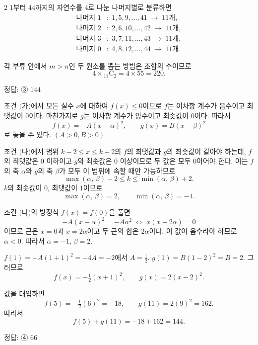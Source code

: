 \documentclass[10pt]{article}
\begin{document}
\begin{multicols}{2}
$1$부터 $44$까지의 자연수를 $4$로 나눈 나머지별로 분류하면
\begin{align*}
\text{나머지 } 1&:\; 1, 5, 9, \ldots, 41 \;\to\; 11\text{개}, \\
\text{나머지 } 2&:\; 2, 6, 10, \ldots, 42 \;\to\; 11\text{개}, \\
\text{나머지 } 3&:\; 3, 7, 11, \ldots, 43 \;\to\; 11\text{개}, \\
\text{나머지 } 0&:\; 4, 8, 12, \ldots, 44 \;\to\; 11\text{개}.
\end{align*}

각 부류 안에서 $m > n$인 두 원소를 뽑는 방법은 조합의 수이므로
\[ 4 \times {}_{11}\mathrm{C}_2 = 4 \times 55 = 220. \]

\begin{answerbox}정답: ③ $144$\end{answerbox}

조건 $(\!$가$)$에서 모든 실수 $x$에 대하여 $f(x) \le 0$이므로 $f$는 이차항 계수가 음수이고 최댓값이 $0$이다. 마찬가지로 $g$는 이차항 계수가 양수이고 최솟값이 $0$이다. 따라서
\[ f(x) = -A(x - \alpha)^2,\qquad g(x) = B(x - \beta)^2 \]
로 놓을 수 있다. $(A > 0, B > 0)$

조건 $(\!$나$)$에서 범위 $k - 2 \le x \le k + 2$의 $f$의 최댓값과 $g$의 최솟값이 같아야 하는데, $f$의 최댓값은 $0$ 이하이고 $g$의 최솟값은 $0$ 이상이므로 두 값은 모두 $0$이어야 한다. 이는 $f$의 축 $\alpha$와 $g$의 축 $\beta$가 모두 이 범위에 속할 때만 가능하므로
\[ \max(\alpha,\,\beta) - 2 \le k \le \min(\alpha,\,\beta) + 2. \]
$k$의 최솟값이 $0$, 최댓값이 $1$이므로
\[ \max(\alpha,\,\beta) = 2,\qquad \min(\alpha,\,\beta) = -1. \]

조건 $(\!$다$)$의 방정식 $f(x) = f(0)$을 풀면
\[ -A(x - \alpha)^2 = -A \alpha^2 \;\Longleftrightarrow\; x(x - 2\alpha) = 0 \]
이므로 근은 $x = 0$과 $x = 2\alpha$이고 두 근의 합은 $2\alpha$이다. 이 값이 음수라야 하므로 $\alpha < 0$. 따라서 $\alpha = -1$, $\beta = 2$.

$f(1) = -A(1 + 1)^2 = -4A = -2$에서 $A = \tfrac{1}{2}$.
$g(1) = B(1 - 2)^2 = B = 2$.
그러므로
\[ f(x) = -\tfrac{1}{2}(x + 1)^2,\qquad g(x) = 2(x - 2)^2. \]

값을 대입하면
\[ f(5) = -\tfrac{1}{2}(6)^2 = -18,\qquad g(11) = 2(9)^2 = 162. \]
따라서
\[ f(5) + g(11) = -18 + 162 = 144. \]

\begin{answerbox}정답: ④ $66$\end{answerbox}


\end{multicols}
\end{document}
